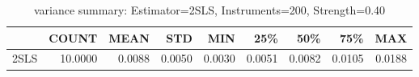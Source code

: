 \begin{table}[ht]
\centering
\caption{variance summary: Estimator=2SLS, Instruments=200, Strength=0.40}
\begin{tabular}{lrrrrrrrr}
\toprule
 & COUNT & MEAN & STD & MIN & 25\% & 50\% & 75\% & MAX \\
\midrule
2SLS & 10.0000 & 0.0088 & 0.0050 & 0.0030 & 0.0051 & 0.0082 & 0.0105 & 0.0188 \\
\bottomrule
\end{tabular}
\end{table}
